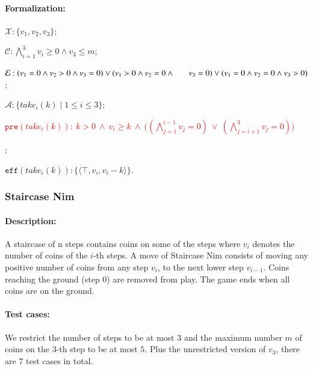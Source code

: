 \documentclass[review]{elsarticle}
\newcommand{\set}[1]{\{ #1 \}}
\newcommand{\tuple}[1]{\langle {#1} \rangle}
\newcommand{\true}{\top}
\newcommand{\statevar}{\mathcal{X}}
\newcommand{\act}{\mathcal{A}}
\newcommand{\constraint}{\mathcal{C}}
\newcommand{\estate}{\mathcal{E}}
\newcommand{\pre}{\mathtt{pre}}
\newcommand{\eff}{\mathtt{eff}}
\begin{document}
\paragraph{Formalization:}
\begin{itemize}
	\item $\statevar: \set{v_1, v_2 ,v_3}$;
	\item $\constraint:\bigwedge_{i=1}^{3} v_i \ge 0 \wedge v_3 \le m$;
	\item $\estate: (v_1 = 0  \wedge v_2 > 0 \wedge  v_3 = 0)\vee (v_1 > 0  \wedge v_2 = 0  \wedge \\ \hspace*{6mm} v_3 = 0)\vee(v_1 = 0  \wedge v_2 = 0 \wedge  v_3 > 0)$;
	\item $\act:\set{take_i(k) {\mid} 1 \le i \le 3}$;
	\textcolor{red}{\item $\pre(take_i(k)):\ k > 0\ \wedge\ v_i\ge k\ \wedge\
         \big( (\bigwedge_{j=1}^{i-1} v_j=0)\ \vee\ (\bigwedge_{j=i+1}^{3} v_j=0) \big)$};
	\item $\eff(take_i(k)) : \set{\tuple{\true,v_i,v_i -k}}$.
\end{itemize}

\subsubsection{Staircase Nim \protect\cite{Spr1937}}

\paragraph{Description:} 
A staircase of n steps contains coins on some of the steps where $v_i$ denotes the number of coins of the $i$-th steps.
A move of Staircase Nim consists of moving any positive number of coins from any step $v_i$, to the next lower step $v_{i-1}$. 
Coins reaching the ground (step 0) are removed from play. 
The game ends when all coins are on the ground. 

\paragraph{Test cases:}
We restrict the number of steps to be at most $3$ and the maximum number $m$ of coins on the $3$-th step to be at most $5$.
Plus the unrestricted version of $v_3$, there are $7$ test cases in total.
\end{document}
